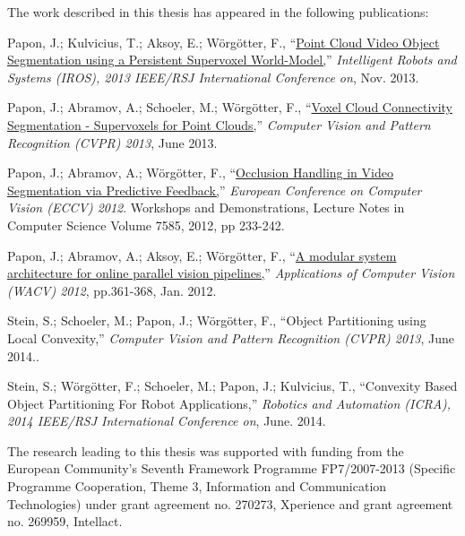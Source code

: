 
\noindent


The work described in this thesis has appeared in the following publications: \\
\vspace{24pt} 

\hangindent=1.5cm Papon, J.;  Kulvicius, T.; Aksoy, E.; Wörgötter, F., ``\href{http://www.dpi.physik.uni-goettingen.de/cns/uploads_bibtexmodule/PDF/paponkulviciusaksoy2013.pdf}{Point Cloud Video Object Segmentation using a Persistent Supervoxel World-Model,}'' \emph{Intelligent Robots and Systems (IROS), 2013 IEEE/RSJ International Conference on}, Nov. 2013. \\
\vspace{12pt}

\hangindent=1.5cm Papon, J.;  Abramov, A.; Schoeler, M.; Wörgötter, F., ``\href{http://www.cv-foundation.org/openaccess/content_cvpr_2013/papers/Papon_Voxel_Cloud_Connectivity_2013_CVPR_paper.pdf}{Voxel Cloud Connectivity Segmentation - Supervoxels for Point Clouds,}'' \emph{Computer Vision and Pattern Recognition (CVPR) 2013}, June 2013. \\
\vspace{12pt}

\hangindent=1.5cm Papon, J.;  Abramov, A.; Wörgötter, F., ``\href{http://dx.doi.org/10.1007/978-3-642-33885-4_24}{Occlusion Handling in Video Segmentation via Predictive Feedback,}'' \emph{European Conference on Computer Vision (ECCV) 2012}. Workshops and Demonstrations, Lecture Notes in Computer Science Volume 7585, 2012, pp 233-242. \\
\vspace{12pt}

\hangindent=1.5cm Papon, J.;  Abramov, A.; Aksoy, E.; Wörgötter, F., ``\href{http://dx.doi.org/10.1109/WACV.2012.6163002}{A modular system architecture for online parallel vision pipelines,}'' \emph{Applications of Computer Vision (WACV) 2012}, pp.361-368, Jan. 2012. \\
\vspace{100pt}

\hangindent=1.5cm Stein, S.; Schoeler, M.; Papon, J.;  Wörgötter, F., ``{Object Partitioning using Local Convexity,}'' \emph{Computer Vision and Pattern Recognition (CVPR) 2013}, June 2014..

\hangindent=1.5cm Stein, S.;  Wörgötter, F.; Schoeler, M.; Papon, J.; Kulvicius, T., ``{Convexity Based Object Partitioning For Robot Applications,}'' \emph{Robotics and Automation (ICRA), 2014 IEEE/RSJ International Conference on}, June. 2014.


The research leading to this thesis was supported with funding from the European Community's Seventh Framework Programme FP7/2007-2013 (Specific Programme Cooperation, Theme 3, Information and Communication Technologies) under grant agreement no. 270273, Xperience and grant agreement no. 269959, Intellact.

 
